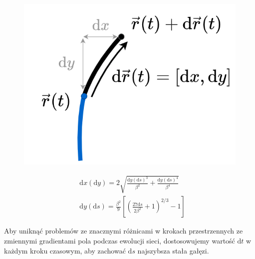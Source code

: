 \documentclass[]{pracamgr}
\begin{document}
      \begin{figure}[h]
        \centering
        \begin{minipage}{0.25\textwidth}
          \centering
          \includegraphics[width=\textwidth, trim={0 0 285 0},clip]{figs/growth.png}
        \end{minipage}
        \hspace{-40pt}
        \begin{minipage}{0.6\textwidth}
          \begin{align}
            \label{x_growth}
            & \textrm{d}x(\textrm{d}y)=2\sqrt{\frac{\textrm{d}y(\textrm{d}s)^3}{\beta^2}+\frac{\textrm{d}y(\textrm{d}s)^4}{\beta^4}}\\
            \label{y_growth}
            & \textrm{d}y(\textrm{d}s)=\frac{\beta^2}{9}\left[\left(\frac{27 \textrm{d}s}{2 \beta ^2}+1\right)^{2/3} - 1 \right]
          \end{align}
        \end{minipage}
        \vspace{0pt}
      \end{figure}

      Aby uniknąć problemów ze znacznymi różnicami w krokach przestrzennych ze zmiennymi gradientami pola podczas ewolucji sieci, dostosowujemy wartość $\textrm{d}t$ w każdym kroku czasowym, aby zachować $\textrm{d}s$ najszybsza stała gałęzi.
\end{document}
